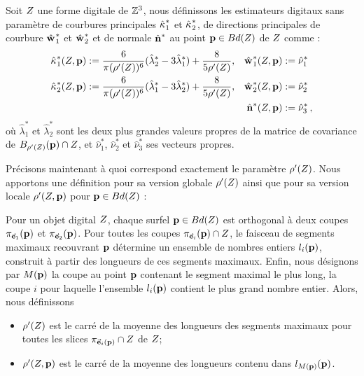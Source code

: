%
\begin{definition}
  Soit $Z$ une forme digitale de $\mathbb{Z}^3$, nous définissons les estimateurs
  digitaux sans paramètre de courbures principales $\hat{\kappa_{}}_{1}^{*}$ et
  $\hat{\kappa_{}}_{2}^{*}$, de directions principales de courbure $\hat{\mathbf{w}_{}}_{1}^{*}$ et
  $\hat{\mathbf{w}_{}}_{2}^{*}$ et de normale $\hat{\mathbf{n}{}}^{*}$ au point $\mathbf{p} \in
  Bd({Z})$ de $Z$ comme :
  \begin{align}
      \hat{\kappa_{}}_{1}^{*}(Z, \mathbf{p})  &:= \frac{6}{\pi (\rho'(Z))^6}(\hat{\lambda}^{*}_2 - 3\hat{\lambda}^{*}_1) + \frac{8}{5 \rho'(Z)},
      &\hat{\mathbf{w}_{}}_{1}^{*}(Z, \mathbf{p}) &:= \hat{\nu}^{*}_1 \\
      \hat{\kappa_{}}_{2}^{*}(Z, \mathbf{p}) &:= \frac{6}{\pi (\rho'(Z))^6}(\hat{\lambda}^{*}_1 - 3\hat{\lambda}^{*}_2) + \frac{8}{5 \rho'(Z)},
      &\hat{\mathbf{w}_{}}_{2}^{*}(Z, \mathbf{p}) &:= \hat{\nu}^{*}_2\\
      & &\hat{\mathbf{n}{}}^{*}(Z, \mathbf{p}) &:=\hat{\nu}^{*}_3\,,
  \end{align}
  où $\hat{\lambda}^{*}_1$ et $\hat{\lambda}^{*}_2$ sont les deux plus grandes
  valeurs propres de la matrice de covariance de $B_{{\rho'(Z)}}(\mathbf{p})
  \cap Z$, et $ \hat{\nu}^{*}_1$, $\hat{\nu}^{*}_2$ et $\hat{\nu}^{*}_3$
  ses vecteurs propres.
  \label{def:curvature-estimator-3d-k1k2-pf}
\end{definition}
%
Précisons maintenant à quoi correspond exactement le paramètre
$\rho'(Z)$. Nous apportons une définition pour sa version globale
$\rho'(Z)$ ainsi que pour sa version locale $\rho'(Z, \mathbf{p})$ pour
$\mathbf{p} \in Bd({Z})$ :
%
\begin{definition}
  \label{def:rho-dig-3d}
  Pour un objet digital $Z$, chaque surfel $\mathbf{p} \in Bd({Z})$ est
  orthogonal à deux coupes $\pi_{\vec{\mathbf{e}}_1}(\mathbf{p})$ et $\pi_{\vec{\mathbf{e}}_2}(\mathbf{p})$.
  Pour toutes les coupes $\pi_{\vec{\mathbf{e}}_i}(\mathbf{p}) \cap Z$, le faisceau de
  segments maximaux recouvrant $\mathbf{p}$ détermine un ensemble de nombres entiers
  $l_i(\mathbf{p})$, construit à partir des longueurs de ces segments maximaux. Enfin,
  nous désignons par $M(\mathbf{p})$ la coupe au point $\mathbf{p}$ contenant le segment
  maximal le plus long, \cad la coupe $i$ pour laquelle l'ensemble $l_i(\mathbf{p})$
  contient le plus grand nombre entier. Alors, nous définissons
  \begin{itemize}
    \item $\rho'(Z)$ est le carré de la moyenne des longueurs des segments maximaux pour toutes les slices $\pi_{\vec{\mathbf{e}}_i(\mathbf{p})} \cap Z$ de $Z$;
    \item $\rho'(Z, \mathbf{p})$ est le carré de la moyenne des longueurs contenu dans $l_{M(\mathbf{p})}(\mathbf{p})$.
  \end{itemize}
\end{definition}
